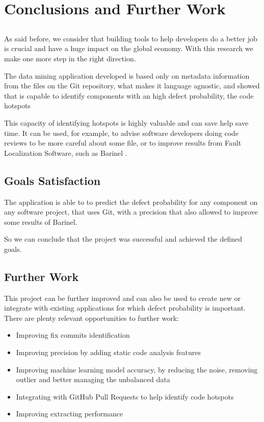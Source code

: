 \chapter{Conclusions and Further Work} \label{chap:conclusions}

\section*{}

As said before, we consider that building tools to help developers do a better job is crucial and have a huge impact on the global economy. With this research we make one more step in the right direction. 

The data mining application developed is based only on metadata information from the files on the Git repository, what makes it language agnostic, and showed that is capable to identify components with an high defect probability, the code hotspots

This capacity of identifying hotspots is highly valuable and can save help save time. It can be used, for example, to advise software developers doing code reviews to be more careful about some file, or to improve results from Fault Localization Software, such as Barinel .

\section{Goals Satisfaction}

The application is able to to predict the defect probability for any component on any software project, that uses Git, with a precision that also allowed to improve some results of Barinel.

So we can conclude that the project was successful and achieved the defined goals.

\section{Further Work}

This project can be further improved and can also be used to create new or integrate with existing applications for which defect probability is important. There are plenty relevant opportunities to further work:
%
\begin{itemize}
\item Improving fix commits identification
\item Improving precision by adding static code analysis features 
\item Improving machine learning model accuracy, by reducing the noise, removing outlier and better managing the unbalanced data
\item Integrating with GitHub Pull Requests to help identify code hotspots
\item Improving extracting performance
\end{itemize}


